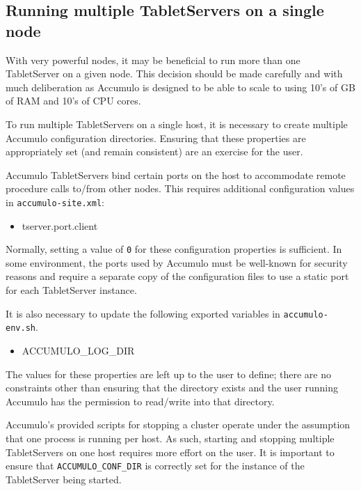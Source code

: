\subsection{Running multiple TabletServers on a single node}

With very powerful nodes, it may be beneficial to run more than one TabletServer on a given
node. This decision should be made carefully and with much deliberation as Accumulo is designed
to be able to scale to using 10's of GB of RAM and 10's of CPU cores.

To run multiple TabletServers on a single host, it is necessary to create multiple Accumulo configuration
directories. Ensuring that these properties are appropriately set (and remain consistent) are an exercise
for the user.

Accumulo TabletServers bind certain ports on the host to accommodate remote procedure calls to/from
other nodes. This requires additional configuration values in \texttt{accumulo-site.xml}:

\begin{itemize}
  \item tserver.port.client
\end{itemize}

Normally, setting a value of \texttt{0} for these configuration properties is sufficient. In some
environment, the ports used by Accumulo must be well-known for security reasons and require a
separate copy of the configuration files to use a static port for each TabletServer instance.

It is also necessary to update the following exported variables in \texttt{accumulo-env.sh}.

\begin{itemize}
  \item ACCUMULO\_LOG\_DIR
\end{itemize}

The values for these properties are left up to the user to define; there are no constraints
other than ensuring that the directory exists and the user running Accumulo has the permission
to read/write into that directory.

Accumulo's provided scripts for stopping a cluster operate under the assumption that one process
is running per host. As such, starting and stopping multiple TabletServers on one host requires
more effort on the user. It is important to ensure that \texttt{ACCUMULO\_CONF\_DIR} is correctly
set for the instance of the TabletServer being started.

